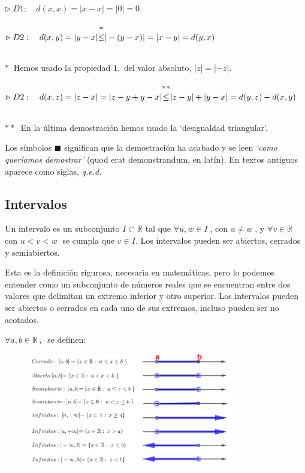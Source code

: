 $\triangleright \ D1:\quad d(x,x)=|x-x|=|0|=0$ \QED

$\triangleright \ D2:\quad d(x,y)=|y-x| \mqty{ * \\ \leq \\ \ } |-(y-x)|=|x-y|=d(y,x)$ \QED

$*\ $ Hemos usado la propiedad $1.\, $ del valor absoluto, $|z|=|-z|$. 

$\triangleright \ D2:\quad d(x,z)=|z-x|=|z-y+y-x|\mqty{ ** \\ \leq \\ \ }|z-y|+|y-x|=d(y,z)+d(x,y)$ \QED

$**\ $ En la última demostración hemos usado la `desigualdad triangular'. 

Los símbolos $\blacksquare$ significan que la demostración ha acabado y se leen \emph{`como queríamos demostrar'} (quod erat demonstrandum, en latín). En textos antiguos aparece como siglas, \emph{q.e.d.}

\vspace{5mm}
\subsection{Intervalos}
\vspace{.5cm} %
		
	
\begin{definition}[ Intervalos] 
	
Un intervalo es un subconjunto $I \subset \mathbb R$ tal que $\forall u,w \in I\; $, con $u\neq w\; $, y $\forall v \in \mathbb R\; $ con $u<v<w\; $ se cumpla que $v\in I$. Los intervalos pueden ser abiertos, cerrados y semiabiertos.\end{definition}

Esta es la definición rigurosa, necesaria en matemáticas, pero lo podemos entender como un subconjunto de números reales que se encuentran entre dos valores que delimitan un extremo inferior y otro superior. Los intervalos pueden ser abiertos o cerrados en cada uno de sus extremos, incluso pueden ser no acotados.

$\forall a,b \in \mathbb R\, ,\ $ se definen:
	
		\begin{figure}[H]
			\centering
			\includegraphics[width=0.8\textwidth]{img-reales/reales08.png}
		\end{figure}

